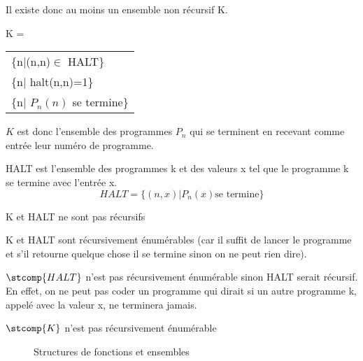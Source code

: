 Il existe donc au moins un ensemble non récursif
K.

\begin{mydef}[K]
	K =
	\begin{tabular}{l}
		\{n|(n,n)$\in$ HALT\}\\
		\{n| halt(n,n)=1\}\\
		\{n| $P_n(n)$ se termine\}
	\end{tabular}

	$K$ est donc l'ensemble des programmes $P_n$ qui se terminent en recevant comme entrée leur numéro de programme.
\end{mydef}

\begin{mydef}[HALT]
	HALT est l'ensemble des programmes k et des valeurs x tel que le programme k se termine avec l'entrée x.
	\[ HALT = \{(n,x)|P_n(x)\text{se termine}\}\]
\end{mydef}

\begin{myprop}
	K et HALT ne sont pas récursifs
\end{myprop}

\begin{myprop}
	K et HALT sont récursivement énumérables (car il suffit de lancer le programme et s’il retourne quelque chose il se termine sinon on ne peut rien dire).
\end{myprop}

\begin{myprop}
	$\stcomp{HALT}$ n'est pas récursivement énumérable sinon HALT serait récursif.  En effet, on ne peut pas coder un programme qui dirait si un autre programme k, appelé avec la valeur x, ne terminera jamais.
\end{myprop}

\begin{myprop}
	$\stcomp{K}$ n'est pas récursivement énumérable
\end{myprop}

\begin{figure}[h]
  \centering
  \caption{Structures de fonctions et ensembles}
  \label{rb}
\end{figure}


